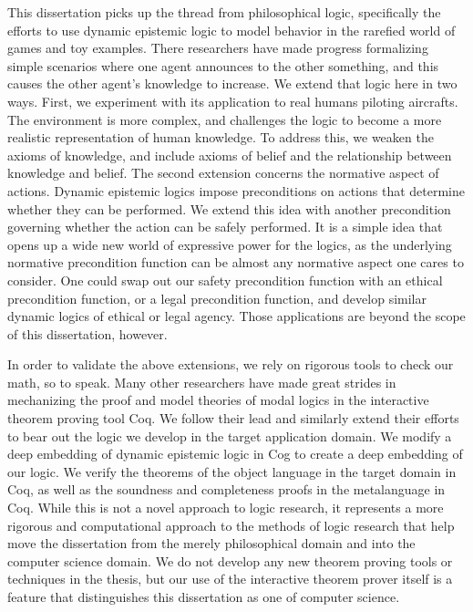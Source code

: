 This dissertation picks up the thread from philosophical logic, specifically the efforts to use dynamic epistemic logic to model behavior in the rarefied world of games and toy examples. There researchers have made progress formalizing simple scenarios where one agent announces to the other something, and this causes the other agent's knowledge to increase. We extend that logic here in two ways. First, we experiment with its application to real humans piloting aircrafts. The environment is more complex, and challenges the logic to become a more realistic representation of human knowledge. To address this, we weaken the axioms of knowledge, and include axioms of belief and the relationship between knowledge and belief. The second extension concerns the normative aspect of actions. Dynamic epistemic logics impose preconditions on actions that determine whether they can be performed. We extend this idea with another precondition governing whether the action can be safely performed. It is a simple idea that opens up a wide new world of expressive power for the logics, as the underlying normative precondition function can be almost any normative aspect one cares to consider. One could swap out our safety precondition function with an ethical precondition function, or a legal precondition function, and develop similar dynamic logics of ethical or legal agency. Those applications are beyond the scope of this dissertation, however.

In order to validate the above extensions, we rely on rigorous tools to check our math, so to speak. Many other researchers have made great strides in mechanizing the proof and model theories of modal logics in the interactive theorem proving tool Coq. We follow their lead and similarly extend their efforts to bear out the logic we develop in the target application domain. We modify a deep embedding of dynamic epistemic logic in Cog to create a deep embedding of our logic. We verify the theorems of the object language in the target domain in Coq, as well as the soundness and completeness proofs in the metalanguage in Coq. While this is not a novel approach to logic research, it represents a more rigorous and computational approach to the methods of logic research that help move the dissertation from the merely philosophical domain and into the computer science domain. We do not develop any new theorem proving tools or techniques in the thesis, but our use of the interactive theorem prover itself is a feature that distinguishes this dissertation as one of computer science.

